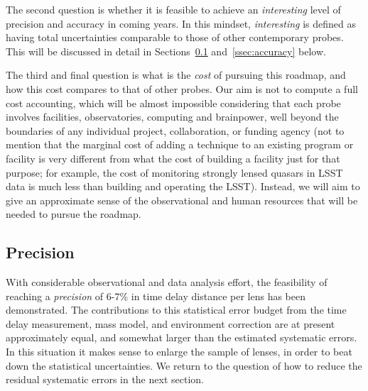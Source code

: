 The second question is whether it is feasible to achieve an {\it
interesting} level of precision and accuracy in coming years. In this
mindset, {\it interesting} is defined as having total uncertainties
comparable to those of other contemporary probes. This will be
discussed in detail in Sections~\ref{ssec:precision}
and~\ref{ssec:accuracy} below.

The third and final question is what is the {\it cost} of pursuing
this roadmap, and how this cost compares to that of other probes. Our aim is not
to compute a full cost accounting, which will be almost impossible
considering that each probe involves facilities, observatories,
computing and brainpower, well beyond the boundaries of any individual
project, collaboration, or funding agency (not to mention that the
marginal cost of adding a technique to an existing program or
facility is very different from what the cost of building a facility
just for that purpose; for example, the cost of monitoring strongly
lensed quasars in LSST data is much less than building and operating
the LSST). Instead, we will aim to give an approximate sense of the
observational and human resources that will be needed to pursue the
roadmap.

%



\subsection{Precision}
\label{ssec:precision}

With considerable observational and data analysis effort, the
feasibility of reaching a {\it precision} of 6-7\% in time delay distance
per lens has been demonstrated. The contributions to this statistical
error budget
from the time delay measurement, mass model, and environment
correction are at present approximately equal, and somewhat larger than
the estimated systematic errors. In this situation it makes sense to
enlarge the sample of lenses, in order to beat down the statistical
uncertainties. We return to the question of how to reduce the residual
systematic errors in the next section.

